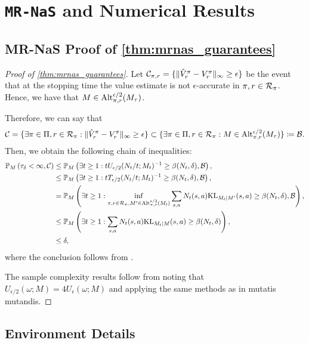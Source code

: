 \section{{\tt MR-NaS} and Numerical Results}\label{app:sec:numerical_results}

\subsection{MR-NaS Proof of \cref{thm:mrnas_guarantees}}\label{app:thm:mrnas_guarantees}
\begin{proof}[Proof of \cref{thm:mrnas_guarantees}]
    Let ${\cal C}_{\pi,r} = \{ \|\hat V_r^\pi -V_r^\pi\|_\infty \geq \epsilon\}$ be the event that at the stopping time the value estimate is not $\epsilon$-accurate in $\pi,r\in {\cal R}_\pi$. Hence, we have that $M\in {\rm Alt}_{\pi,r}^{\epsilon/2}(M_\tau)$.

Therefore, we  can say that
\[{\cal C}=\{\exists \pi\in \Pi, r\in {\cal R}_\pi: \|\hat V_r^\pi -V_r^\pi\|_\infty \geq \epsilon\}  \subset \{\exists \pi\in \Pi, r\in {\cal R}_\pi: M\in {\rm Alt}_{\pi,r}^{\epsilon/2}(M_\tau)\}\coloneqq {\cal B}.\]
Then, we obtain the following chain of inequalities:
    \begin{align*}
\mathbb{P}_M\left(\tau_\delta <\infty  ,  {\cal C} \right) &\leq  \mathbb{P}_M\left(\exists t\geq 1: t U_{\epsilon/2}(N_t/t; M_t)^{-1} \geq \beta(N_t,\delta) ,  {\cal B}\right),\\
        &\leq  \mathbb{P}_M\left(\exists t\geq 1: t T_{\epsilon/2}(N_t/t; M_t)^{-1} \geq \beta(N_t,\delta) , {\cal B}\right),\\
        &=\mathbb{P}_M\left(\exists t\geq 1:  \inf_{\pi,r\in {\cal R}_\pi, M'\in {\rm Alt}_{\pi,r}^{\epsilon/2}(M_t)}\sum_{s,a} N_t(s,a) {\rm KL}_{M_t|M'}(s,a)\geq \beta(N_t,\delta) , {\cal B}\right),\\
        &\leq   \mathbb{P}_M\left(\exists t\geq 1: \sum_{s,a} N_t(s,a) {\rm KL}_{M_t|M}(s,a)\geq \beta(N_t,\delta) \right),\\
        &\leq \delta,
\end{align*}
where the conclusion follows from \citet[Prop. 1]{jonsson2020planning}.

The sample complexity results follow from noting that $U_{\epsilon/2}(\omega;M)=4U_{\epsilon}(\omega;M)$ and applying the same methods as in \citet[Theorem 3.3]{russomulti} mutatis mutandis.
\end{proof}
\subsection{Environment Details}\label{app:environments}


